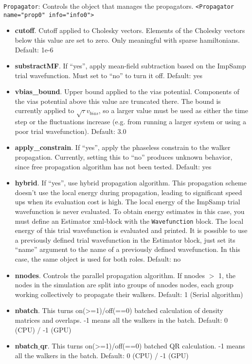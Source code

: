 \texttt{Propagator}: Controls the object that manages the propagators.
\texttt{<Propagator name="prop0" info="info0">}
\begin{itemize}
\item \textbf{cutoff}. Cutoff applied to Cholesky vectors. Elements of the Cholesky vectors below this value are set to zero. Only meaningful with sparse hamiltonians.
    Default: 1e-6
\item \textbf{substractMF}. If ``yes'', apply mean-field subtraction based on the ImpSamp trial wavefunction. Must set to ``no'' to turn it off.
    Default: yes
\item \textbf{vbias\_bound}. Upper bound applied to the vias potential. Components of the vias potential above this value are truncated there. The bound is currently applied to $\sqrt{\tau} v_{bias}$, so a larger value must be used as either the time step or the fluctuations increase (e.g. from running a larger system or using a poor trial wavefunction).
    Default: 3.0
\item \textbf{apply\_constrain}. If ``yes'', apply the phaseless constrain to the walker propagation. Currently, setting this to ``no'' produces unknown behavior, since free propagation algorithm has not been tested.
    Default: yes
\item \textbf{hybrid}. If ``yes'', use hybrid propagation algorithm. This propagation scheme doesn't use the local energy during propagation, leading to significant speed ups when its evaluation  cost is high. The local energy of the ImpSamp trial wavefunction is never evaluated. To obtain energy estimates in this case, you must define an Estimator xml-block with the \texttt{Wavefunction} block. The local energy of this trial wavefunction is evaluated and printed. It is possible to use a previously defined trial wavefunction in the Estimator block, just set its ``name'' argument to the name of a previously defined wavefunction. In this case, the same object is used for both roles.
    Default: no
\item \textbf{nnodes}. Controls the parallel propagation algorithm. If nnodes $>$ 1, the nodes in the simulation are split into groups of nnodes nodes, each group working collectively to propagate their walkers.
    Default: 1 (Serial algorithm)
\item \textbf{nbatch}. This turns on(>=1)/off(==0) batched calculation of density matrices and overlaps. -1 means all the walkers in the batch.
      Default: 0 (CPU) / -1 (GPU)
\item \textbf{nbatch$\_$qr}. This turns on(>=1)/off(==0) batched QR calculation. -1 means all the walkers in the batch.
      Default: 0 (CPU) / -1 (GPU) 
\end{itemize}

